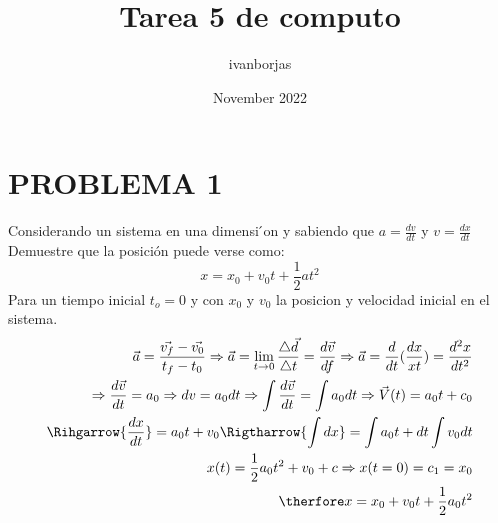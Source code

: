 \documentclass[a4paper, 12pt]{article}
\title{Tarea 5 de computo}
\author{ivanborjas }
\date{November 2022}
\begin{document}
\maketitle

\section{PROBLEMA 1}
 Considerando un sistema en una dimensi ́on y sabiendo que $a = \frac{dv}{dt}$ y $v=\frac{dx}{dt}$ Demuestre que la posición puede verse como:
 \begin{equation}
     x= x_0+v_0t+\frac{1}{2}at^{2}
 \end{equation}
 Para un tiempo inicial $t_o= 0$ y con $x_0$ y $v_0$ la posicion y velocidad inicial en el sistema.\\
 \newline
 \begin{align*}
     \vec{a} = \frac{\vec{v_f}-\vec{v_0}}{t_f-t_0}\Rightarrow{\vec{a}}= \lim_{t\rightarrow{0}}{ \frac{\triangle \vec{d}}{\triangle t}} = \frac{d\vec{v}}{df} \Rightarrow{\vec{a}} = \frac{d}{dt}(\frac{dx}{xt}) = \frac{d^{2}x}{dt^{2}}\\
     \Rightarrow{\frac{d\vec{v}}{dt}} = a_0 \Rightarrow{dv} = a_0dt \Rightarrow{\int\frac{d\vec{v}}{dt}} = \int a_0dt \Rightarrow{\vec{V}(t)} = a_0t+c_0\\
     \Rihgarrow{\frac{dx}{dt}} = a_0t+v_0 \Rigtharrow{\int dx}= \int a_0t+dt \int v_0dt\\
     x(t)=\frac{1}{2}a_0t^{2}+v_0+c  \Rightarrow{x(t=0)} =c_1 =x_0\\
     \therfore  x= x_0+v_0t+\frac{1}{2}a_0t^{2}
 \end{align*}
\end{document}
